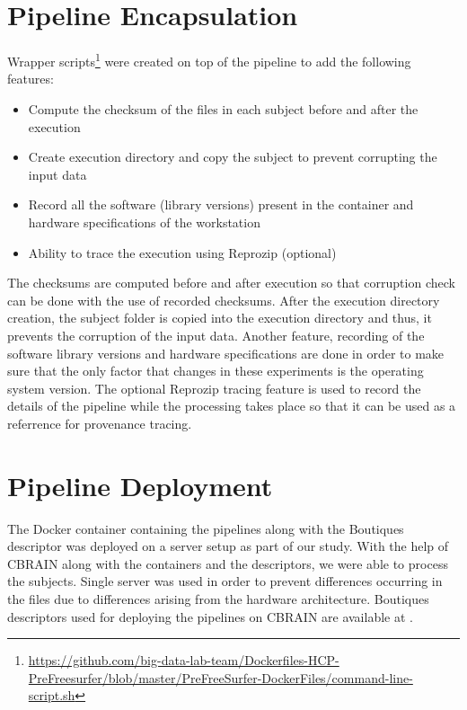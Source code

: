 \section{Pipeline Encapsulation}\label{encapsulation}
Wrapper scripts\footnote{\url{https://github.com/big-data-lab-team/Dockerfiles-HCP-PreFreesurfer/blob/master/PreFreeSurfer-DockerFiles/command-line-script.sh}} were created on top of the pipeline to add the following features:
\begin{itemize}
  \item Compute the checksum of the files in each subject before and after the execution
  \item Create execution directory and copy the subject to prevent corrupting the input data
  \item Record all the software (library versions) present in the container and hardware specifications of the workstation
  \item Ability to trace the execution using Reprozip (optional)
\end{itemize}

The checksums are computed before and after execution so that corruption check can be done with the use of recorded checksums. After the execution directory creation, the subject folder is copied into the execution directory and thus, it prevents the corruption of the input data. Another feature, recording of the software library versions and hardware specifications are done in order to make sure that the only factor that changes in these experiments is the operating system version. The optional Reprozip tracing feature is used to record the details of the pipeline while the processing takes place so that it can be used as a referrence for provenance tracing.

\section{Pipeline Deployment}\label{deployment}
The Docker container containing the pipelines along with the Boutiques descriptor was deployed on a server setup as part of our study. With the help of CBRAIN along with the containers and the descriptors, we were able to process the subjects. Single server was used in order to prevent differences occurring in the files due to differences arising from the hardware architecture. Boutiques descriptors used for deploying the pipelines on CBRAIN are available at \cite{HCP_descriptors}.


